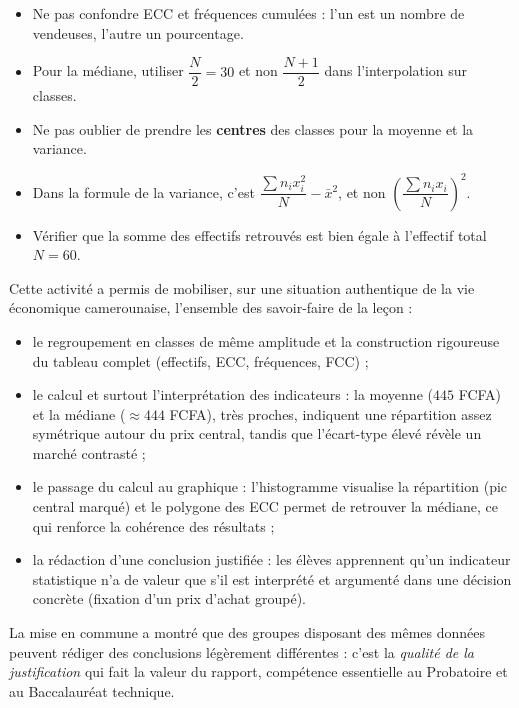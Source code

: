 \documentclass[11pt]{article}
\newcommand{\cle}[1]{{\popxbold\color{popdark}#1}}
\newcounter{popsec}
\newcounter{popsub}
\newcommand{\courssub}[1]{%
  \stepcounter{popsub}%
  \par\vspace{9pt}\noindent{\popxbold\fontsize{11.5}{13}\selectfont\color{popink}{\color{poporange}\thepopsec.\thepopsub}\hspace{6pt}#1}\par\nopagebreak\vspace{4pt}
}
\begin{document}
\begin{attention}
\begin{itemize}
\item Ne pas confondre ECC et fréquences cumulées : l'un est un nombre de vendeuses, l'autre un pourcentage.
\item Pour la médiane, utiliser $\dfrac{N}{2}=30$ et non $\dfrac{N+1}{2}$ dans l'interpolation sur classes.
\item Ne pas oublier de prendre les \textbf{centres} des classes pour la moyenne et la variance.
\item Dans la formule de la variance, c'est $\dfrac{\sum n_i x_i^2}{N}-\bar{x}^2$, et non $\left(\dfrac{\sum n_i x_i}{N}\right)^2$.
\item Vérifier que la somme des effectifs retrouvés est bien égale à l'effectif total $N=60$.
\end{itemize}
\end{attention}

\courssub{Bilan de l'activité}

Cette activité a permis de mobiliser, sur une situation authentique de la vie économique camerounaise, l'ensemble des savoir-faire de la leçon :
\begin{itemize}
\item le \cle{regroupement en classes} de même amplitude et la construction rigoureuse du tableau complet (effectifs, ECC, fréquences, FCC) ;
\item le calcul et surtout l'\cle{interprétation} des indicateurs : la moyenne ($445$ FCFA) et la médiane ($\approx 444$ FCFA), très proches, indiquent une répartition assez symétrique autour du prix central, tandis que l'écart-type élevé révèle un marché contrasté ;
\item le passage du \cle{calcul au graphique} : l'histogramme visualise la répartition (pic central marqué) et le polygone des ECC permet de retrouver la médiane, ce qui renforce la cohérence des résultats ;
\item la \cle{rédaction d'une conclusion justifiée} : les élèves apprennent qu'un indicateur statistique n'a de valeur que s'il est interprété et argumenté dans une décision concrète (fixation d'un prix d'achat groupé).
\end{itemize}
La mise en commune a montré que des groupes disposant des mêmes données peuvent rédiger des conclusions légèrement différentes : c'est la \emph{qualité de la justification} qui fait la valeur du rapport, compétence essentielle au Probatoire et au Baccalauréat technique.
\end{document}
